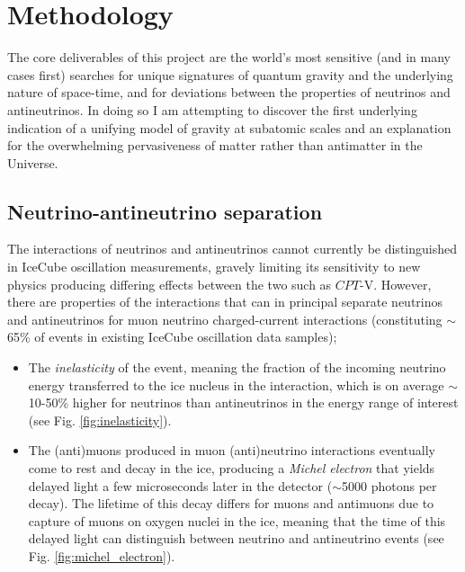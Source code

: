 \documentclass[a4paper,11pt]{article}
\begin{document}
\section{Methodology}
\vspace{0.1 cm}



The core deliverables of this project are the world's most sensitive (and in many cases first) searches for unique signatures of quantum gravity and the underlying nature of space-time, and for deviations between the properties of neutrinos and antineutrinos. In doing so I am attempting to discover the first underlying indication of a unifying model of gravity at subatomic scales and an explanation for the overwhelming pervasiveness of matter rather than antimatter in the Universe. \\


\subsection{Neutrino-antineutrino separation}


The interactions of neutrinos and antineutrinos cannot currently be distinguished in IceCube oscillation measurements, gravely limiting its sensitivity to new physics producing differing effects between the two such as $CPT$-V. However, there are properties of the interactions that can in principal separate neutrinos and antineutrinos for muon neutrino charged-current interactions (constituting $\sim$65\% of events in existing IceCube oscillation data samples);

\begin{itemize}
    \item The \textit{inelasticity} of the event, meaning the fraction of the incoming neutrino energy transferred to the ice nucleus in the interaction, which is on average $\sim$10-50\%  higher for neutrinos than antineutrinos in the energy range of interest (see Fig. \ref{fig:inelasticity}).
    \item The (anti)muons produced in muon (anti)neutrino interactions eventually come to rest and decay in the ice, producing a \textit{Michel electron} that yields delayed light a few microseconds later in the detector ($\sim$5000 photons per decay). The lifetime of this decay differs for muons and antimuons due to capture of muons on oxygen nuclei in the ice, meaning that the time of this delayed light can distinguish between neutrino and antineutrino events (see Fig. \ref{fig:michel_electron}). 
\end{itemize}
\end{document}
